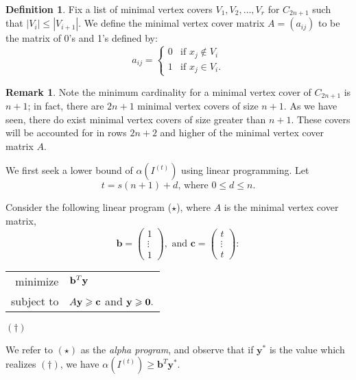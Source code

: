 \documentclass[12pt]{amsart}
\renewcommand{\geq}{\geqslant}
\renewcommand{\leq}{\leqslant}
\theoremstyle{plain}
\theoremstyle{definition}
\newtheorem{definition}[theorem]{Definition}
\newtheorem{remark}[theorem]{Remark}
\begin{document}
\begin{definition}\label{def:minvertexcovermatrix}
Fix a list of minimal vertex covers $V_1,V_2,\ldots,V_{r}$ for $C_{2n+1}$ such that $|V_i| \leq |V_{i+1}|$.
We define the minimal vertex cover matrix $A = (a_{ij})$ to be the matrix of 0's and 1's defined by:
\begin{equation}\label{eq:minvertmat}
	a_{ij} = \begin{cases}
		0 & \text{if $x_j\notin V_i$}\\
		1 & \text{if $x_j\in V_i$}.
	\end{cases}
\end{equation}
\end{definition}

\begin{remark}
	Note the minimum cardinality for a minimal vertex cover of $C_{2n+1}$ is $n+1$; in fact, there are $2n+1$ minimal vertex covers of size $n+1$.
	As we have seen, there do exist minimal vertex covers of size greater than $n+1$.
	These covers will be accounted for in rows $2n+2$ and higher of the minimal vertex cover matrix $A$.
\end{remark}

We first seek a lower bound of $\alpha(I^{(t)})$ using  linear programming.
Let 
\[
	t = s(n+1) + d \text{, where } 0 \leq d \leq n.
\]

Consider the following linear program ($\star$), where $A$ is the minimal vertex cover matrix, 
\[
\mathbf{b} = \left(\begin{matrix} 1 \\ \vdots \\ 1 \end{matrix}\right), \text{ and } \mathbf{c} = \left(\begin{matrix} t \\ \vdots \\ t \end{matrix}\right):
\]

\begin{tabular}{rl}
		minimize & ${\bf b}^T{\bf y} $\\
		subject to & $A{\bf y} \geq {\bf c}$ and  ${\bf y} \geq {\bf 0}.$
	\end{tabular}\hspace{2cm}$(\dagger)$

\noindent We refer to $(\star)$ as the \emph{alpha program}, and observe that if $\mathbf{y}^*$ is the value which realizes $(\dagger)$, we have $\alpha(I^{(t)}) \geq \mathbf{b}^T \mathbf{y}^*$.
\end{document}
